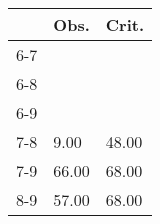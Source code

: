 \begin{table}[ht]
\centering
\begin{tabular}{rll}
  \hline
 & Obs. & Crit. \\ 
  \hline
6-7 &  &  \\ 
  6-8 &  &  \\ 
  6-9 &  &  \\ 
  7-8 & 9.00 & 48.00 \\ 
  7-9 & 66.00 & 68.00 \\ 
  8-9 & 57.00 & 68.00 \\ 
   \hline
\end{tabular}
\end{table}
